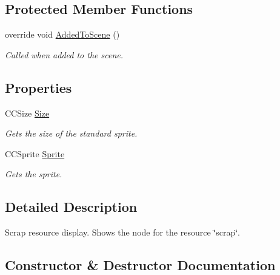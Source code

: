 \subsection*{Protected Member Functions}
\begin{DoxyCompactItemize}
\item 
override void \hyperlink{classClient_1_1Common_1_1Views_1_1HUD_1_1ScrapResource_ab4b6e08af97dfee60d3b379b2d4554ec}{Added\+To\+Scene} ()
\begin{DoxyCompactList}\small\item\em Called when added to the scene. \end{DoxyCompactList}\end{DoxyCompactItemize}
\subsection*{Properties}
\begin{DoxyCompactItemize}
\item 
C\+C\+Size \hyperlink{classClient_1_1Common_1_1Views_1_1HUD_1_1ScrapResource_a45e22fe16ccf02f8efd0ea3bdf7498a9}{Size}
\begin{DoxyCompactList}\small\item\em Gets the size of the standard sprite. \end{DoxyCompactList}\item 
C\+C\+Sprite \hyperlink{classClient_1_1Common_1_1Views_1_1HUD_1_1ScrapResource_ac3135280912a00edcf479fcd8ecebaaf}{Sprite}
\begin{DoxyCompactList}\small\item\em Gets the sprite. \end{DoxyCompactList}\end{DoxyCompactItemize}


\subsection{Detailed Description}
Scrap resource display. Shows the node for the resource \char`\"{}scrap\char`\"{}. 



\subsection{Constructor \& Destructor Documentation}
\hypertarget{classClient_1_1Common_1_1Views_1_1HUD_1_1ScrapResource_a00f6583d31c22c9af3cfc16ceb9ebefd}{}
